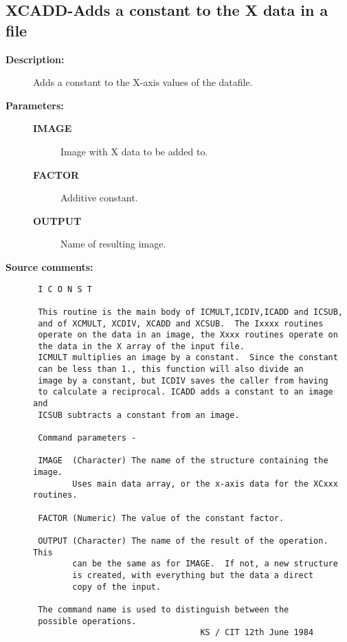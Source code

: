 \subsection{XCADD-\label{XCADD}Adds a constant to the X data in a file}
\begin{description}

\item [{\bf Description:}]
 Adds a constant to the X-axis values of the datafile.

\item [{\bf Parameters:}]
\begin{description}
\item [{\bf IMAGE}]
 Image with X data to be added to.
\item [{\bf FACTOR}]
 Additive constant.
\item [{\bf OUTPUT}]
 Name of resulting image.
\end{description}

\item [{\bf Source comments:}]
\begin{verbatim}
 I C O N S T

 This routine is the main body of ICMULT,ICDIV,ICADD and ICSUB,
 and of XCMULT, XCDIV, XCADD and XCSUB.  The Ixxxx routines
 operate on the data in an image, the Xxxx routines operate on
 the data in the X array of the input file.
 ICMULT multiplies an image by a constant.  Since the constant
 can be less than 1., this function will also divide an
 image by a constant, but ICDIV saves the caller from having
 to calculate a reciprocal. ICADD adds a constant to an image and
 ICSUB subtracts a constant from an image.

 Command parameters -

 IMAGE  (Character) The name of the structure containing the image.
        Uses main data array, or the x-axis data for the XCxxx routines.

 FACTOR (Numeric) The value of the constant factor.

 OUTPUT (Character) The name of the result of the operation.  This
        can be the same as for IMAGE.  If not, a new structure
        is created, with everything but the data a direct
        copy of the input.

 The command name is used to distinguish between the
 possible operations.
                                  KS / CIT 12th June 1984
\end{verbatim}
\end{description}
